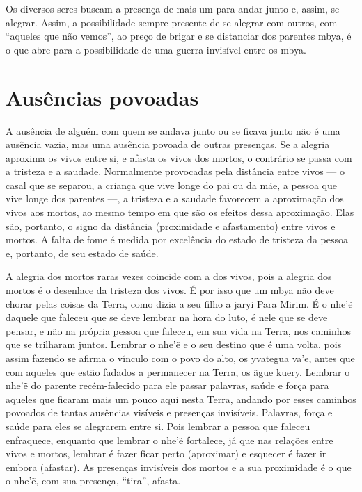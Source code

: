Os diversos seres buscam a presença de mais um para andar junto e,
assim, se alegrar. Assim, a possibilidade sempre presente de se alegrar
com outros, com ``aqueles que não vemos'', ao preço de brigar e se
distanciar dos parentes mbya, é o que abre para a possibilidade de uma
guerra invisível entre os mbya. 

\section{Ausências povoadas}

A ausência de alguém com quem se andava junto ou se ficava junto não é
uma ausência vazia, mas uma ausência povoada de outras presenças. Se a
alegria aproxima os vivos entre si, e afasta os vivos dos mortos, o
contrário se passa com a tristeza e a saudade. Normalmente provocadas
pela distância entre vivos --- o casal que se separou, a criança que vive
longe do pai ou da mãe, a pessoa que vive longe dos parentes ---, a
tristeza e a saudade favorecem a aproximação dos vivos aos mortos, ao
mesmo tempo em que são os efeitos dessa aproximação. Elas são,
portanto, o signo da distância (proximidade e afastamento) entre vivos
e mortos. A falta de fome é medida por excelência do estado de tristeza
da pessoa e, portanto, de seu estado de saúde. 

A alegria dos mortos raras vezes coincide com a dos vivos, pois a
alegria dos mortos é o desenlace da tristeza dos vivos. É por isso que
um mbya não deve chorar pelas coisas da Terra, como dizia a seu filho a
jaryi Para Mirim. É o nhe’\~{e} daquele que faleceu que se deve
lembrar na hora do luto, é nele que se deve pensar, e não na própria
pessoa que faleceu, em sua vida na Terra, nos caminhos que se trilharam
juntos. Lembrar o nhe’\~{e} e o seu destino que é uma volta, pois
assim fazendo se afirma o vínculo com o povo do alto, os yvategua va’e,
antes que com aqueles que estão fadados a permanecer na Terra, os ãgue
kuery. Lembrar o nhe’\~{e} do parente recém-falecido para ele passar
palavras, saúde e força para aqueles que ficaram mais um pouco aqui
nesta Terra, andando por esses caminhos povoados de tantas ausências
visíveis e presenças invisíveis. Palavras, força e saúde para eles se
alegrarem entre si. Pois lembrar a pessoa que faleceu enfraquece,
enquanto que lembrar o nhe’\~{e} fortalece, já que nas relações entre
vivos e mortos, lembrar é fazer ficar perto (aproximar) e esquecer é
fazer ir embora (afastar). As presenças invisíveis dos mortos e a sua
proximidade é o que o nhe’\~{e}, com sua presença, ``tira'', afasta.

